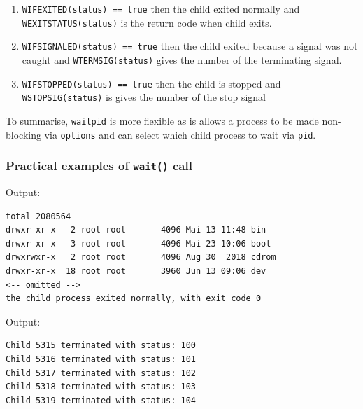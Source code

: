 \documentclass[a4paper]{article}
\begin{document}
\begin{enumerate}
    \item \texttt{WIFEXITED(status) == true} then the child exited normally
and \texttt{WEXITSTATUS(status)} is the return code when child exits.
    \item \texttt{WIFSIGNALED(status) == true} then the child exited because a signal was not caught and 
\texttt{WTERMSIG(status)} gives the number of the terminating signal.
    \item \texttt{WIFSTOPPED(status) == true} then the child is stopped and 
\texttt{WSTOPSIG(status)} is gives the number of the stop signal
\end{enumerate}

To summarise, \texttt{waitpid} is more flexible as is allows a process to be made non-blocking via \texttt{options} and can select which child process to wait via \texttt{pid}.




\subsubsection{Practical examples of \texttt{wait()} call}




\begin{exmp}
\textup{

}
\end{exmp}
Output:
\begin{verbatim}
total 2080564
drwxr-xr-x   2 root root       4096 Mai 13 11:48 bin
drwxr-xr-x   3 root root       4096 Mai 23 10:06 boot
drwxrwxr-x   2 root root       4096 Aug 30  2018 cdrom
drwxr-xr-x  18 root root       3960 Jun 13 09:06 dev
<-- omitted -->
the child process exited normally, with exit code 0
\end{verbatim}

\begin{exmp}
\textup{

}
\end{exmp}
Output:
\begin{verbatim}
Child 5315 terminated with status: 100
Child 5316 terminated with status: 101
Child 5317 terminated with status: 102
Child 5318 terminated with status: 103
Child 5319 terminated with status: 104
\end{verbatim}
\end{document}
